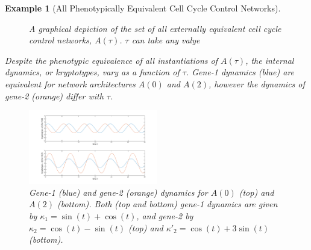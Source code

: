 \documentclass[9 pt]{article}
\newcommand{\1}{\mathbbm{1}}
\newtheorem{example}{Example}
\begin{document}
\begin{example}[All Phenotypically Equivalent Cell Cycle Control Networks]
\begin{figure}[H]
    \caption{A graphical depiction of the set of all externally equivalent cell cycle control networks, $A(\tau)$. $\tau$ can take any valye}
    \end{figure}

   Despite the phenotypic equivalence of all instantiations of $A(\tau)$, the internal dynamics, or kryptotypes, vary as a function of $\tau$. 
    Gene-1 dynamics (blue) are equivalent for network architectures $A(0)$ and $A(2)$, however the dynamics of gene-2 (orange) differ with $\tau$.
  \begin{figure}[H]
    \centering
    \includegraphics[width=0.5\textwidth, height=0.25\paperheight]{osc_A0_A2_both_compare}
    \caption{Gene-1 (blue) and gene-2 (orange) dynamics for $A(0)$ (top) and $A(2)$ (bottom). Both (top and bottom) gene-1 dynamics are given by $ \kappa_{1} = \sin(t) + \cos(t)$, and gene-2 by $\kappa_{2} = \cos(t) - \sin(t)$ (top) and $\kappa'_{2} = \cos(t) + 3 \sin(t)$ (bottom).}
  \end{figure}
  \end{example}
\end{document}

